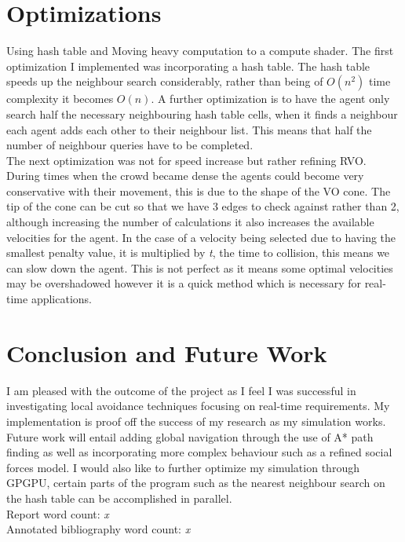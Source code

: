 \documentclass[a4paper,twocolumn]{article}
\begin{document}
\section{Optimizations}
Using hash table and Moving heavy computation to a compute shader. \cite{NOthman2013SP}
The first optimization I implemented was incorporating a hash table. The hash table speeds up the neighbour search considerably, rather than being of $O(n^{2})$ time complexity it becomes $O(n)$. A further optimization is to have the agent only search half the necessary neighbouring hash table cells, when it finds a neighbour each agent adds each other to their neighbour list. This means that half the number of neighbour queries have to be completed.\\
The next optimization was not for speed increase but rather refining RVO. During times when the crowd became dense the agents could become very conservative with their movement, this is due to the shape of the VO cone. The tip of the cone can be cut so that we have 3 edges to check against rather than 2\cite{AGuy2009CP}, although increasing the number of calculations it also increases the available velocities for the agent. In the case of a velocity being selected due to having the smallest penalty value, it is multiplied by \emph{t}, the time to collision, this means we can slow down the agent. This is not perfect as it means some optimal velocities may be overshadowed however it is a quick method which is necessary for real-time applications.\\

\section{Conclusion and Future Work}
I am pleased with the outcome of the project as I feel I was successful in investigating local avoidance techniques focusing on real-time requirements. My implementation is proof off the success of my research as my simulation works. Future work will entail adding global navigation through the use of A* path finding as well as incorporating more complex behaviour such as a refined social forces model. I would also like to further optimize my simulation through GPGPU, certain parts of the program such as the nearest neighbour search on the hash table can be accomplished in parallel\cite{GGHT}.\\


%





Report word count: \emph{x}\\
Annotated bibliography word count: \emph{x}
\end{document}
